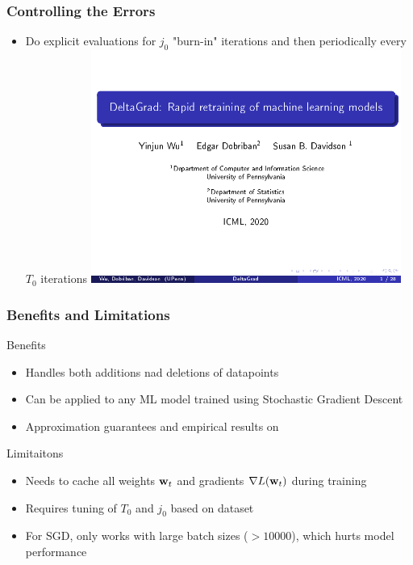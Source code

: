 \documentclass[pdf]{beamer}
\begin{document}
\begin{frame}
  \frametitle{Controlling the Errors}
  \begin{itemize}
    \item Do explicit evaluations for $j_{0}$ "burn-in" iterations and then periodically every $T_{0}$ iterations
    \includegraphics[page=46,clip,trim=0.5cm 1cm 0cm 1cm,width=0.8\textwidth]{images/Slides.pdf}
  \end{itemize}
\end{frame}

\begin{frame}
  \frametitle{Benefits and Limitations}
  \begin{block}{Benefits}
    \begin{itemize}
      \item Handles both additions nad deletions of datapoints
      \item Can be applied to any ML model trained using Stochastic Gradient Descent
      \item Approximation guarantees and empirical results on 
    \end{itemize}
  \end{block}
  \begin{alertblock}{Limitaitons}
    \begin{itemize}
      \item Needs to cache all weights $\textbf{w}_{t}$ and gradients $\nabla L(\textbf{w}_{t})$ during training
      \item Requires tuning of $T_{0}$ and $j_{0}$ based on dataset
      \item For SGD, only works with large batch sizes ($>10000$), which hurts model performance 
    \end{itemize}
  \end{alertblock}
  

\end{frame}
\end{document}
